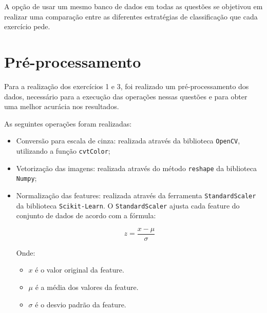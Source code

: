 \documentclass[]{abntex2}
\begin{document}
A opção de usar um mesmo banco de dados em todas as questões se objetivou em realizar uma comparação entre as diferentes estratégias de classificação que cada exercício pede.




\section*{\textbf{Pré-processamento}}

Para a realização dos exercícios 1 e 3, foi realizado um pré-processamento dos dados, necessário para a execução das operações nessas questões e para obter uma melhor acurácia nos resultados.

As seguintes operações foram realizadas:

\begin{itemize}
    \item Conversão para escala de cinza: realizada através da biblioteca \texttt{OpenCV}, utilizando a função \texttt{cvtColor};
    \item Vetorização das imagens: realizada através do método \texttt{reshape} da biblioteca \texttt{Numpy};
    \item Normalização das features: realizada através da ferramenta \texttt{StandardScaler} da biblioteca \texttt{Scikit-Learn}. O \texttt{StandardScaler} ajusta cada feature do conjunto de dados de acordo com a fórmula:
    
    \[
    z = \frac{x - \mu}{\sigma}
    \]
    
    Onde:
    \begin{itemize}
        \item \( x \) é o valor original da feature.
        \item \( \mu \) é a média dos valores da feature.
        \item \( \sigma \) é o desvio padrão da feature.
    \end{itemize}
    
\end{itemize}
\end{document}
